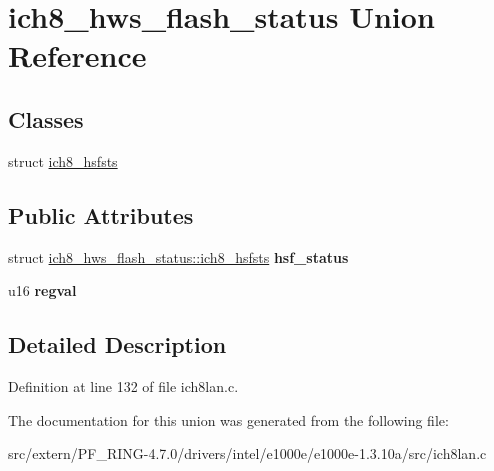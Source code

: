 \hypertarget{unionich8__hws__flash__status}{
\section{ich8\_\-hws\_\-flash\_\-status Union Reference}
\label{unionich8__hws__flash__status}
}
\subsection*{Classes}
\begin{DoxyCompactItemize}
\item 
struct \hyperlink{structich8__hws__flash__status_1_1ich8__hsfsts}{ich8\_\-hsfsts}
\end{DoxyCompactItemize}
\subsection*{Public Attributes}
\begin{DoxyCompactItemize}
\item 
\hypertarget{unionich8__hws__flash__status_a9cdbb5312e49d523757bfd4dbc068415}{
struct \hyperlink{structich8__hws__flash__status_1_1ich8__hsfsts}{ich8\_\-hws\_\-flash\_\-status::ich8\_\-hsfsts} {\bfseries hsf\_\-status}}
\label{unionich8__hws__flash__status_a9cdbb5312e49d523757bfd4dbc068415}

\item 
\hypertarget{unionich8__hws__flash__status_a064bbceb0e63d1be289c3731a2e0035c}{
u16 {\bfseries regval}}
\label{unionich8__hws__flash__status_a064bbceb0e63d1be289c3731a2e0035c}

\end{DoxyCompactItemize}


\subsection{Detailed Description}


Definition at line 132 of file ich8lan.c.



The documentation for this union was generated from the following file:\begin{DoxyCompactItemize}
\item 
src/extern/PF\_\-RING-\/4.7.0/drivers/intel/e1000e/e1000e-\/1.3.10a/src/ich8lan.c\end{DoxyCompactItemize}
